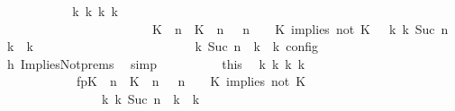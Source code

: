 \begin{isabellebody}
\ \ \ \ \ \ \ \ \isamarkupfalse%
\ \isamarkupfalse%
\ {\isacartoucheopen}{\isasymexists}{\isasymGamma}\isactrlsub k\ {\isasymPsi}\isactrlsub k\ {\isasymPhi}\isactrlsub k\ k{\isachardot}\ {\isacharparenleft}\isanewline
\ \ \ \ \ \ \ \ \ \ \ \ \ \ \ \ \ \ \ \ \ \ \ \ {\isacharparenleft}{\isacharparenleft}{\isacharparenleft}K\ {\isasymUp}\ n{\isacharparenright}\ {\isacharhash}\ {\isacharparenleft}K\ {\isasymnot}{\isasymUp}\ n{\isacharparenright}\ {\isacharhash}\ {\isasymGamma}{\isacharparenright}{\isacharcomma}\ n\ {\isasymturnstile}\ {\isasymPsi}\ {\isasymtriangleright}\ {\isacharparenleft}{\isacharparenleft}K\ implies\ not\ K\ {\isacharhash}\ {\isasymPhi}{\isacharparenright}{\isacharparenright}\ {\isasymhookrightarrow}\isactrlbsup k\isactrlesup \ {\isacharparenleft}{\isasymGamma}\isactrlsub k{\isacharcomma}\ Suc\ n\ {\isasymturnstile}\ {\isasymPsi}\isactrlsub k\ {\isasymtriangleright}\ {\isasymPhi}\isactrlsub k{\isacharparenright}\isanewline
\ \ \ \ \ \ \ \ \ \ \ \ \ \ \ \ \ \ \ \ {\isacharparenright}\ {\isasymand}\ {\isasymrho}\ {\isasymin}\ {\isasymlbrakk}\ {\isasymGamma}\isactrlsub k{\isacharcomma}\ Suc\ n\ {\isasymturnstile}\ {\isasymPsi}\isactrlsub k\ {\isasymtriangleright}\ {\isasymPhi}\isactrlsub k\ {\isasymrbrakk}\isactrlsub c\isactrlsub o\isactrlsub n\isactrlsub f\isactrlsub i\isactrlsub g{\isacartoucheclose}\isanewline
\ \ \ \ \ \ \ \ \ \ \isamarkupfalse%
\ h{}\ ImpliesNot{\isachardot}prems\ \isamarkupfalse%
\ simp\isanewline
\ \ \ \ \ \ \ \ \isamarkupfalse%
\ this\ \isamarkupfalse%
\ {\isasymGamma}\isactrlsub k\ {\isasymPsi}\isactrlsub k\ {\isasymPhi}\isactrlsub k\ k\ \isanewline
\ \ \ \ \ \ \ \ \ \ \ \ fp{\isacharcolon}{\isacartoucheopen}{\isacharparenleft}{\isacharparenleft}{\isacharparenleft}K\ {\isasymUp}\ n{\isacharparenright}\ {\isacharhash}\ {\isacharparenleft}K\ {\isasymnot}{\isasymUp}\ n{\isacharparenright}\ {\isacharhash}\ {\isasymGamma}{\isacharparenright}{\isacharcomma}\ n\ {\isasymturnstile}\ {\isasymPsi}\ {\isasymtriangleright}\ {\isacharparenleft}{\isacharparenleft}K\ implies\ not\ K\ {\isacharhash}\ {\isasymPhi}{\isacharparenright}{\isacharparenright}\isanewline
\ \ \ \ \ \ \ \ \ \ \ \ \ \ \ \ {\isasymhookrightarrow}\isactrlbsup k\isactrlesup \ {\isacharparenleft}{\isasymGamma}\isactrlsub k{\isacharcomma}\ Suc\ n\ {\isasymturnstile}\ {\isasymPsi}\isactrlsub k\ {\isasymtriangleright}\ {\isasymPhi}\isactrlsub k{\isacharparenright}{\isacartoucheclose}\isanewline

\end{isabellebody}
